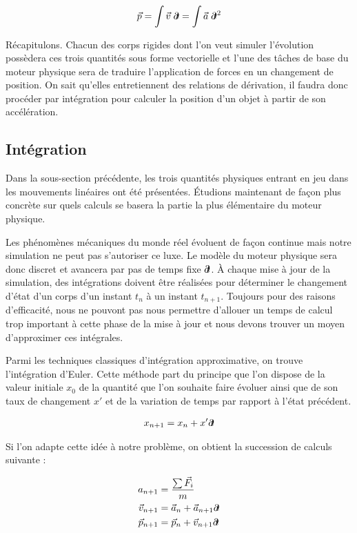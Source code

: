 \begin{align*}
  \vec{p} = \int \vec{v}\; \partial \!\! t = \int \vec{a}\; \partial \!\! t^2
\end{align*}

Récapitulons. Chacun des corps rigides dont l'on veut simuler l'évolution possèdera ces trois quantités sous forme vectorielle et l'une des tâches de base du moteur physique sera de traduire l'application de forces en un changement de position. On sait qu'elles entretiennent des relations de dérivation, il faudra donc procéder par intégration pour calculer la position d'un objet à partir de son accélération.

\subsection{Intégration}

Dans la sous-section précédente, les trois quantités physiques entrant en jeu dans les mouvements linéaires ont été présentées. \'Etudions maintenant de façon plus concrète sur quels calculs se basera la partie la plus élémentaire du moteur physique.

Les phénomènes mécaniques du monde réel évoluent de façon continue mais notre simulation ne peut pas s'autoriser ce luxe. Le modèle du moteur physique sera donc discret et avancera par pas de temps fixe $\partial \!\! t$. \`A chaque mise à jour de la simulation, des intégrations doivent être réalisées pour déterminer le changement d'état d'un corps d'un instant $t_n$ à un instant $t_{n+1}$. Toujours pour des raisons d'efficacité, nous ne pouvont pas nous permettre d'allouer un temps de calcul trop important à cette phase de la mise à jour et nous devons trouver un moyen d'approximer ces intégrales.

Parmi les techniques classiques d'intégration approximative, on trouve l'intégration d'Euler. Cette méthode part du principe que l'on dispose de la valeur initiale $x_0$ de la quantité que l'on souhaite faire évoluer ainsi que de son taux de changement $x'$ et de la variation de temps par rapport à l'état précédent.

\begin{align*}
  x_{n+1} = x_{n} + x' \partial \!\! t
\end{align*}

Si l'on adapte cette idée à notre problème, on obtient la succession de calculs suivante :

\begin{align*}
  a_{n+1} &= \frac{\sum \vec{F}_i}{m} \\
  \vec{v}_{n+1} &= \vec{a}_n + \vec{a}_{n+1} \partial \!\! t \\
  \vec{p}_{n+1} &= \vec{p}_n + \vec{v}_{n+1} \partial \!\! t
\end{align*}

